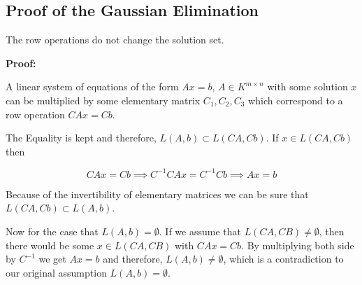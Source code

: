 

\subsection{Proof of the Gaussian Elimination}

The row operations do not change the solution set. 
\vspace{\baselineskip}

\textbf{Proof:}

A linear system of equations of the form \(Ax = b\), \(A \in K^{m \times n}\) with some solution
\(x\) can be multiplied by some elementary matrix \(C_1, C_2, C_3\) which correspond to a row 
operation \(CAx = Cb\).
\vspace{\baselineskip}

The Equality is kept and therefore, \(L(A,b) \subset L(CA, Cb)\). If \(x \in L(CA, Cb)\) then

\[
CAx = Cb \implies C^{-1}CAx = C^{-1}Cb \implies Ax = b
\]

Because of the invertibility of elementary matrices we can be sure that  \(L(CA, Cb) \subset L(A,b) \).
\vspace{\baselineskip}

Now for the case that \(L(A,b) = \emptyset\). If we assume that \(L(CA,CB) \ne \emptyset \), then 
there would be some \(x \in L(CA,CB)\) with \(CAx = Cb\). By multiplying both side by \(C^{-1}\) we 
get \(Ax = b\) and therefore, \(L(A, b) \ne \emptyset \),  which is a contradiction to our original
assumption  \(L(A,b) = \emptyset\).

